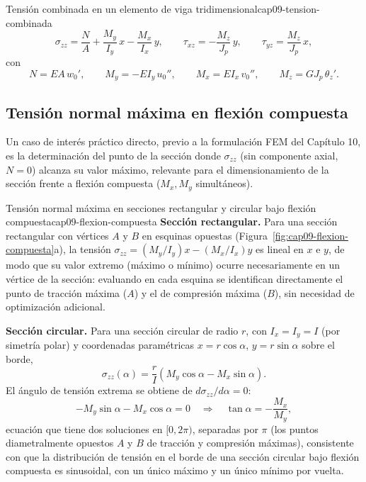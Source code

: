 \begin{ecnimportante}{Tensión combinada en un elemento de viga tridimensional}{cap09-tension-combinada}
\[
\sigma_{zz} = \frac{N}{A} + \frac{M_y}{I_y}\,x - \frac{M_x}{I_x}\,y , \qquad
\tau_{xz} = -\frac{M_z}{J_p}\,y , \qquad
\tau_{yz} = \frac{M_z}{J_p}\,x ,
\]
con
\[
N=EA\,w_0', \qquad M_y=-EI_y\,u_0'', \qquad M_x=EI_x\,v_0'', \qquad M_z=GJ_p\,\theta_z' .
\]
\end{ecnimportante}

\subsection{Tensión normal máxima en flexión compuesta}

Un caso de interés práctico directo, previo a la formulación FEM del Capítulo 10, es la determinación del punto de la sección donde $\sigma_{zz}$ (sin componente axial, $N=0$) alcanza su valor máximo, relevante para el dimensionamiento de la sección frente a flexión compuesta ($M_x,M_y$ simultáneos).

\begin{ejemplo}{Tensión normal máxima en secciones rectangular y circular bajo flexión compuesta}{cap09-flexion-compuesta}
\textbf{Sección rectangular.} Para una sección rectangular con vértices $A$ y $B$ en esquinas opuestas (Figura~\ref{fig:cap09-flexion-compuesta}a), la tensión $\sigma_{zz}=(M_y/I_y)x-(M_x/I_x)y$ es lineal en $x$ e $y$, de modo que su valor extremo (máximo o mínimo) ocurre necesariamente en un vértice de la sección: evaluando en cada esquina se identifican directamente el punto de tracción máxima ($A$) y el de compresión máxima ($B$), sin necesidad de optimización adicional.

\textbf{Sección circular.} Para una sección circular de radio $r$, con $I_x=I_y=I$ (por simetría polar) y coordenadas paramétricas $x=r\cos\alpha$, $y=r\sin\alpha$ sobre el borde,
\[
\sigma_{zz}(\alpha) = \frac{r}{I}\left(M_y\cos\alpha - M_x\sin\alpha\right) .
\]
El ángulo de tensión extrema se obtiene de $d\sigma_{zz}/d\alpha=0$:
\[
-M_y\sin\alpha - M_x\cos\alpha = 0 \quad\Longrightarrow\quad \tan\alpha = -\frac{M_x}{M_y} ,
\]
ecuación que tiene dos soluciones en $[0,2\pi)$, separadas por $\pi$ (los puntos diametralmente opuestos $A$ y $B$ de tracción y compresión máximas), consistente con que la distribución de tensión en el borde de una sección circular bajo flexión compuesta es sinusoidal, con un único máximo y un único mínimo por vuelta.
\end{ejemplo}

